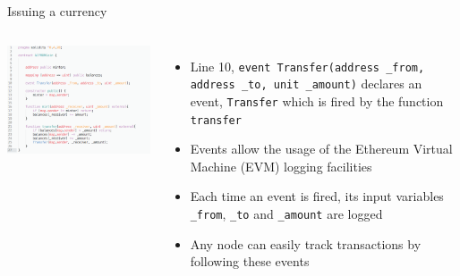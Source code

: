 \documentclass[11pt]{beamer}
\begin{document}
\begin{frame}{Issuing a currency}
	\begin{columns}
	    \includegraphics  [scale=0.3]{Images/contract_new}

	    \begin{itemize}
			\item Line 10, \texttt{event Transfer(address \_from, address \_to, unit  \_amount)} declares an event, \texttt{Transfer} which is fired by the function \texttt{transfer}
			\item Events allow the usage of the Ethereum Virtual Machine (EVM) logging facilities
			\item Each time an event is fired, its input variables \texttt{\_from}, \texttt{\_to} and \texttt{\_amount} are logged
			\item Any node can easily track transactions by following these events
	    \end{itemize}
	\end{columns}
\end{frame}

\end{document}
